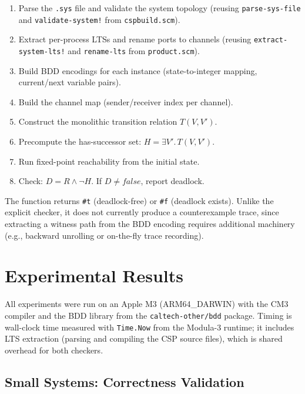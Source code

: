 \documentclass[11pt]{article}
\begin{document}
\begin{enumerate}
\item Parse the \texttt{.sys} file and validate the system topology
      (reusing \texttt{parse-sys-file} and \texttt{validate-system!}
      from \texttt{cspbuild.scm}).
\item Extract per-process LTSs and rename ports to channels (reusing
      \texttt{extract-system-lts!} and \texttt{rename-lts} from
      \texttt{product.scm}).
\item Build BDD encodings for each instance (state-to-integer mapping,
      current/next variable pairs).
\item Build the channel map (sender/receiver index per channel).
\item Construct the monolithic transition relation $T(V, V')$.
\item Precompute the has-successor set:
      $H = \exists V'.\, T(V, V')$.
\item Run fixed-point reachability from the initial state.
\item Check: $D = R \wedge \neg H$.  If $D \neq \mathit{false}$,
      report deadlock.
\end{enumerate}

The function returns \texttt{\#t} (deadlock-free) or \texttt{\#f}
(deadlock exists).  Unlike the explicit checker, it does not currently
produce a counterexample trace, since extracting a witness path from
the BDD encoding requires additional machinery (e.g., backward
unrolling or on-the-fly trace recording).

\section{Experimental Results}

All experiments were run on an Apple M3 (ARM64\_DARWIN) with the
CM3 compiler and the BDD library from the \texttt{caltech-other/bdd}
package.  Timing is wall-clock time measured with \texttt{Time.Now}
from the Modula-3 runtime; it includes LTS extraction (parsing and
compiling the CSP source files), which is shared overhead for both
checkers.

\subsection{Small Systems: Correctness Validation}
\end{document}
